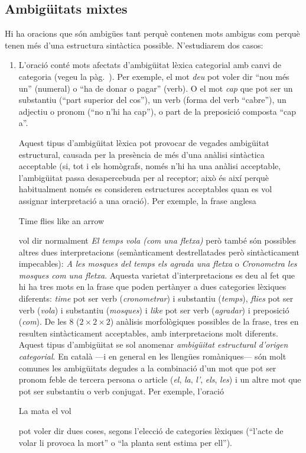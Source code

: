 \subsection{Ambigüitats mixtes}
Hi ha oracions que són ambigües tant perquè contenen mots ambigus com
perquè tenen més d'una estructura sintàctica possible. N'estudiarem
dos casos:
\begin{enumerate}
\item L'oració conté mots afectats d'ambigüitat lèxica categorial amb
  canvi de categoria (vegeu la pàg.~\pageref{pg:catlex}).  Per
  exemple, el mot \emph{deu} pot voler dir ``nou més un'' (numeral) o
  ``ha de donar o pagar'' (verb).  O el mot \emph{cap} que pot ser un
  substantiu (``part superior del cos''), un verb (forma del verb
  ``cabre''), un adjectiu o pronom (``no n'hi ha cap''), o part de la
  preposició composta ``cap a''.
  
  Aquest tipus d'ambigüitat lèxica pot provocar de vegades ambigüitat
  estructural, causada per la presència de més d'una anàlisi
  sintàctica acceptable (si, tot i els homògrafs, només n'hi ha una
  anàlisi acceptable, l'ambigüitat passa desapercebuda per al
  receptor; això és així perquè habitualment només es consideren
  estructures acceptables quan es vol assignar interpretació a una
  oració).  Per exemple, la frase anglesa
  \begin{exemple}
    Time flies like an arrow
  \end{exemple}
  vol dir normalment \emph{El temps vola (com una fletxa)} però també
  són possibles altres dues interpretacions (semànticament
  destrellatades però sintàcticament impecables): \emph{A les mosques
    del temps els agrada una fletxa} o \emph{Cronometra les mosques
    com una fletxa}.  Aquesta varietat d'interpretacions es deu al fet
  que hi ha tres mots en la frase que poden pertànyer a dues
  categories lèxiques diferents: \emph{time} pot ser verb
  (\emph{cronometrar}) i substantiu (\emph{temps}), \emph{flies} pot
  ser verb (\emph{vola}) i substantiu (\emph{mosques}) i \emph{like}
  pot ser verb (\emph{agradar}) i preposició (\emph{com}).  De les 8
  ($2\times 2\times 2$) anàlisis morfològiques possibles de la frase,
  tres en resulten sintàcticament acceptables, amb interpretacions
  molt diferents. Aquest tipus d'ambigüitat se sol anomenar
  \emph{ambigüitat estructural d'origen categorial}. En català ---i en
  general en les llengües romàniques--- són molt comunes les
  ambigüitats degudes a la combinació d'un mot que pot ser pronom
  feble de tercera persona o article (\emph{el}, \emph{la}, \emph{l'},
  \emph{els}, \emph{les}) i un altre mot que pot ser substantiu o verb
  conjugat. Per exemple, l'oració
    \begin{exemple}
      La mata el vol
    \end{exemple} 
    pot voler dir dues coses, segons l'elecció de categories lèxiques
    (``l'acte de volar li provoca la mort'' o ``la planta sent estima
    per ell'').
  

\end{enumerate}
